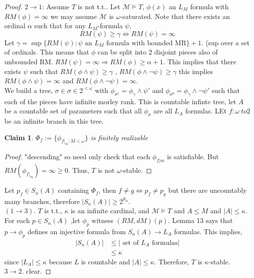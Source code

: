 \documentclass[letterpaper, 12pt]{article}
\newcommand{\cM}{\mathcal{M}}
\theoremstyle{stdthm}
\theoremstyle{stddef}
\theoremstyle{stdnonum}
\newtheorem{claim}{Claim}
\theoremstyle{stdqands}
\theoremstyle{stdbold}
\begin{document}
\begin{proof}
$2\to 1$: Assume $T$ is not t.t.. Let $\cM \models T$, $\phi(x)$ an $L_M$ formula with $RM(\phi) = \infty$ we may assume $\cM$ is $\omega$-saturated. Note that there exists an ordinal $\alpha$ such that for any $L_M$-formula $\psi$, 
\[ RM(\psi) \geq \gamma \iff RM(\psi)  = \infty \]
Let $\gamma = \sup\{RM(\psi): \psi \mbox{ an } L_M \mbox{ formula with bounded MR}\} + 1$. (sup over a set of ordinals. This means that $\phi$ can be split into 2 disjoint pieces also of unbounded RM.  $RM(\psi) = \infty \Rightarrow RM(\phi) \geq \alpha+1$. This implies that there exists $\psi$ such that $RM(\phi \wedge \psi) \geq \gamma$ , $RM(\phi \wedge \neg \psi) \geq \gamma$ this implies $RM(\phi \wedge \psi) = \infty$ and $RM(\phi \wedge \neg \psi) = \infty$. \\

We build a tree, $\sigma \in \sigma \in 2^{< \omega}$ with $\phi_{\sigma^1} = \phi_\gamma \wedge \psi'$ and $\phi_{\sigma^0} = \phi_\gamma \wedge \neg \psi'$ such that each of the pieces have infinite morley rank. This is countable infinte tree, let $A$ be a countable set of parameters such that all $\phi_\sigma$ are all $L_A$ formulas. LEt $f: \omega\ to 2$ be an infinite branch in this tree. \\

\begin{claim}
$\Phi_f:= \{\phi_{f|_m: M<\omega}\}$ is finitely realizable
\end{claim}
 
 \begin{proof}
 "descending" so need only check that each $\phi_{f|m}$ is satisfiable. But $RM(\phi_{f|_m}) = \infty \geq 0$.  Thus, $T$ is not $\omega$-stable. 
 \end{proof}
 
Let $p_f \in S_n(A)$ containing $\Phi_f$, then $f\neq g \iff p_f \neq p_g$ but there are uncountably many branches, therefore $|S_n(A)| \geq 2^{\aleph_0}$.  \\


$(1\to 3)$. $T$ is t.t., $\kappa$ is an infinite cardinal, and $\cM \models T$ and $A \leq M$ and $|A| \leq \kappa$. For each $p \in S_n(A)$ ,let $\phi_p$ witness $(RM,dM)(p)$. Lemma 13 says that $p\to \phi_p$ defines an injective formula from $S_n(A) \to L_A$ formulas. This implies, 
\begin{align*}
|S_n(A)| &\leq |\mbox{ set of }L_A \mbox{ formulas} | \\
&\leq \kappa
\end{align*}
since $|L_A| \leq \kappa$ because $L$ is countable and $|A| \leq \kappa$. Therefore, $T$ is $\kappa$-stable. \\

$3\to 2$. clear. 
 
 
\end{proof}
\end{document}
